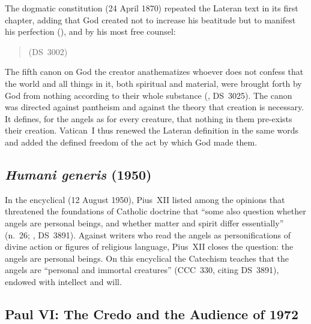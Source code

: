 The dogmatic constitution  (24 April 1870) repeated the
Lateran text in its first chapter, adding that God created not to increase
his beatitude but to manifest his perfection (), and by his
most free counsel:
\begin{quote}
 (DS~3002)
\end{quote}
The fifth canon on God the creator anathematizes whoever does not confess
that the world and all things in it, both spiritual and material, were
brought forth by God from nothing according to their whole substance
(, DS~3025). The canon was directed against
pantheism and against the theory that creation is necessary. It defines,
for the angels as for every creature, that nothing in them pre-exists their
creation. Vatican~I thus renewed the Lateran definition in the same words
and added the defined freedom of the act by which God made them.

\sectionguard
\subsection{\emph{Humani generis} (1950)}

In the encyclical  (12 August 1950), Pius~XII listed
among the opinions that threatened the foundations of Catholic doctrine
that ``some also question whether angels are personal beings, and whether
matter and spirit differ essentially'' (n.~26; , DS~3891). Against writers who read the angels as personifications of
divine action or figures of religious language, Pius~XII closes the
question: the angels are personal beings. On this encyclical the Catechism
teaches that the angels are ``personal and immortal creatures'' (CCC~330,
citing DS~3891), endowed with intellect and will.

\sectionguard
\subsection{Paul VI: The Credo and the Audience of 1972}


